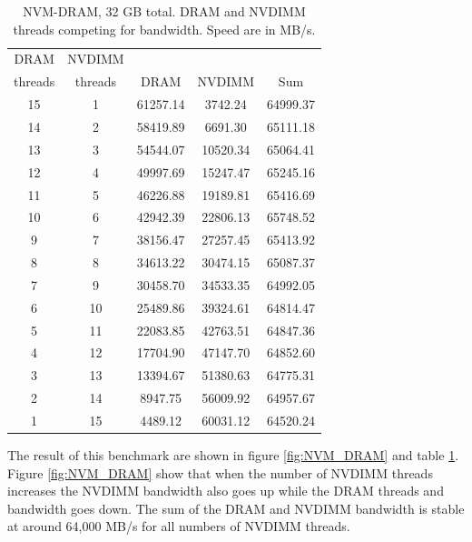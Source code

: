 \documentclass[12pt,a4paper,USenglish]{article}      %
\begin{document}
\begin{table}[!hbtp]
\centering
\begin{tabular}{ |c|c|c|c|c| } 
\hline
DRAM & NVDIMM & & & \\
threads & threads & DRAM & NVDIMM & Sum \\
\hline
15 & 1 & 61257.14 & 3742.24 & 64999.37 \\
\hline
14 & 2 & 58419.89 & 6691.30 & 65111.18 \\
\hline
13 & 3 & 54544.07 & 10520.34 & 65064.41 \\
\hline
12 & 4 & 49997.69 & 15247.47 & 65245.16 \\
\hline
11 & 5 & 46226.88 & 19189.81 & 65416.69 \\
\hline
10 & 6 & 42942.39 & 22806.13 & 65748.52 \\
\hline
9 & 7 & 38156.47 & 27257.45 & 65413.92 \\
\hline
8 & 8 & 34613.22 & 30474.15 & 65087.37 \\
\hline
7 & 9 & 30458.70 & 34533.35 & 64992.05 \\
\hline
6 & 10 & 25489.86 & 39324.61 & 64814.47 \\
\hline
5 & 11 & 22083.85 & 42763.51 & 64847.36 \\
\hline
4 & 12 & 17704.90 & 47147.70 & 64852.60 \\
\hline
3 & 13 & 13394.67 & 51380.63 & 64775.31 \\
\hline
2 & 14 & 8947.75 & 56009.92 & 64957.67 \\
\hline
1 & 15 & 4489.12 & 60031.12 & 64520.24 \\
\hline
\end{tabular}
\caption{NVM-DRAM, 32 GB total. DRAM and NVDIMM threads competing for bandwidth. Speed are in MB/s.}
\label{tab:NVM_DRAM}
\end{table}

The result of this benchmark are shown in figure \ref{fig:NVM_DRAM} and table \ref{tab:NVM_DRAM}. Figure \ref{fig:NVM_DRAM} show that when the number of NVDIMM threads increases the NVDIMM bandwidth also goes up while the DRAM threads and bandwidth goes down. The sum of the DRAM and NVDIMM bandwidth is stable at around 64,000 MB/s for all numbers of NVDIMM threads. 
\end{document}
